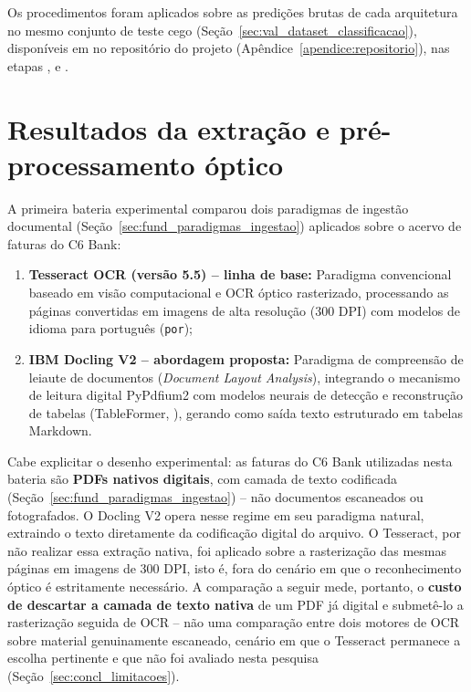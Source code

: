 Os procedimentos foram aplicados sobre as predições brutas de cada arquitetura no mesmo conjunto de teste cego (Seção~\ref{sec:val_dataset_classificacao}), disponíveis em  no repositório do projeto (Apêndice~\ref{apendice:repositorio}), nas etapas ,  e .

\section{Resultados da extração e pré-processamento óptico}
\label{sec:val_resultados_ocr}

A primeira bateria experimental comparou dois paradigmas de ingestão documental (Seção~\ref{sec:fund_paradigmas_ingestao}) aplicados sobre o acervo de faturas do C6 Bank:
\begin{enumerate}
	\item \textbf{Tesseract OCR (versão 5.5) -- linha de base:} Paradigma convencional baseado em visão computacional e OCR óptico rasterizado, processando as páginas convertidas em imagens de alta resolução (300 DPI) com modelos de idioma para português (\texttt{por});
	\item \textbf{IBM Docling V2 -- abordagem proposta:} Paradigma de compreensão de leiaute de documentos (\textit{Document Layout Analysis}), integrando o mecanismo de leitura digital PyPdfium2 com modelos neurais de detecção e reconstrução de tabelas (TableFormer, ), gerando como saída texto estruturado em tabelas Markdown.
\end{enumerate}

Cabe explicitar o desenho experimental: as faturas do C6 Bank utilizadas nesta bateria são \textbf{PDFs nativos digitais}, com camada de texto codificada (Seção~\ref{sec:fund_paradigmas_ingestao}) -- não documentos escaneados ou fotografados. O Docling V2 opera nesse regime em seu paradigma natural, extraindo o texto diretamente da codificação digital do arquivo. O Tesseract, por não realizar essa extração nativa, foi aplicado sobre a rasterização das mesmas páginas em imagens de 300 DPI, isto é, fora do cenário em que o reconhecimento óptico é estritamente necessário. A comparação a seguir mede, portanto, o \textbf{custo de descartar a camada de texto nativa} de um PDF já digital e submetê-lo a rasterização seguida de OCR -- não uma comparação entre dois motores de OCR sobre material genuinamente escaneado, cenário em que o Tesseract permanece a escolha pertinente e que não foi avaliado nesta pesquisa (Seção~\ref{sec:concl_limitacoes}).

